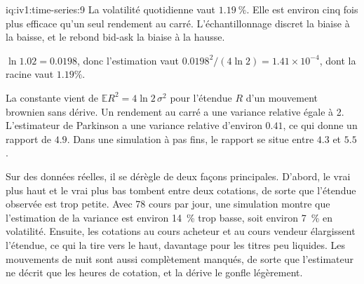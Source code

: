 \begin{solution}{iq:iv1:time-series:9}
La volatilité quotidienne vaut $1.19~\%$. Elle est environ cinq fois plus efficace qu'un seul rendement au carré. L'échantillonnage discret la biaise à la baisse, et le rebond bid-ask la biaise à la hausse.

$\ln 1.02 = 0.0198$, donc l'estimation vaut $0.0198^2/(4\ln 2) = 1.41 \times 10^{-4}$, dont la racine vaut $1.19\%$.

La constante vient de $\mathbb{E}R^2 = 4\ln 2\,\sigma^2$ pour l'étendue $R$ d'un mouvement brownien sans dérive. Un rendement au carré a une variance relative égale à 2. L'estimateur de Parkinson a une variance relative d'environ $0.41$, ce qui donne un rapport de $4.9$. Dans une simulation à pas fins, le rapport se situe entre $4.3$ et $5.5$.

Sur des données réelles, il se dérègle de deux façons principales. D'abord, le vrai plus haut et le vrai plus bas tombent entre deux cotations, de sorte que l'étendue observée est trop petite. Avec 78 cours par jour, une simulation montre que l'estimation de la variance est environ 14~\% trop basse, soit environ 7~\% en volatilité. Ensuite, les cotations au cours acheteur et au cours vendeur élargissent l'étendue, ce qui la tire vers le haut, davantage pour les titres peu liquides. Les mouvements de nuit sont aussi complètement manqués, de sorte que l'estimateur ne décrit que les heures de cotation, et la dérive le gonfle légèrement.



\end{solution}

